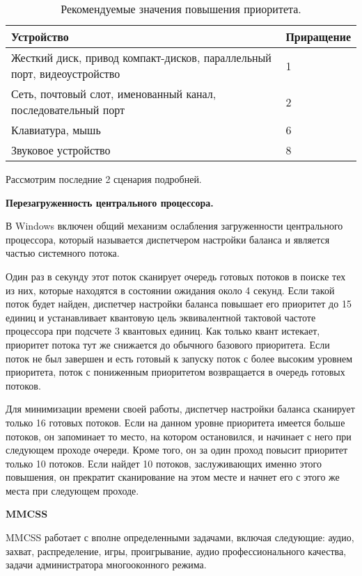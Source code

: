 \begin{table}[h!]
	\caption{Рекомендуемые значения повышения приоритета.}
	\begin{center}
		\begin{tabular}{|p{100mm}|l|}
			\hline
			\textbf{Устройство} & \textbf{Приращение} \\
			\hline
			Жесткий диск, привод компакт-дисков, параллельный порт, видеоустройство & 1 \\
			\hline
			Сеть, почтовый слот, именованный канал, последовательный порт & 2 \\
			\hline
			Клавиатура, мышь & 6 \\
			\hline
			Звуковое устройство & 8 \\
			\hline
		\end{tabular}
	\end{center}
	\label{tab:io}
\end{table}

Рассмотрим последние 2 сценария подробней. 

\textbf{Перезагруженность центрального процессора.}

В Windows включен общий механизм ослабления загруженности центрального процессора, который называется диспетчером настройки баланса и является частью системного потока.

Один раз в секунду этот поток сканирует очередь готовых потоков в поиске тех из них, которые находятся в состоянии ожидания около 4 секунд. Если такой поток будет найден, диспетчер настройки баланса повышает его приоритет до 15 единиц и устанавливает квантовую цель эквивалентной тактовой частоте процессора при подсчете 3 квантовых единиц. Как только квант истекает, приоритет потока тут же снижается до обычного базового приоритета. Если поток не был завершен и есть готовый к запуску поток с более высоким уровнем приоритета, поток с пониженным приоритетом возвращается в очередь готовых потоков.

Для минимизации времени своей работы, диспетчер настройки баланса сканирует только 16 готовых потоков. Если на данном уровне приоритета имеется больше потоков, он запоминает то место, на котором остановился, и начинает с него при следующем проходе очереди. Кроме того, он за один проход повысит приоритет только 10 потоков. Если найдет 10 потоков, заслуживающих именно этого повышения, он прекратит сканирование на этом месте и начнет его с этого же места при следующем проходе.

\textbf{MMCSS}

MMCSS работает с вполне определенными задачами, включая следующие: аудио, захват, распределение, игры, проигрывание, аудио профессионального качества, задачи администратора многооконного режима.

